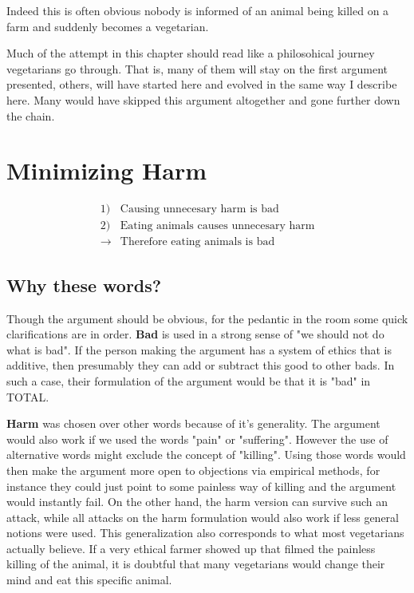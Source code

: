 \documentclass[12pt]{report}
\numberwithin{equation}{section}
\begin{document}
Indeed this is often obvious nobody is informed of an animal being killed on a farm and suddenly becomes a vegetarian.

Much of the attempt in this chapter should read like a philosohical journey vegetarians go through. That is, many of them will stay on the first argument presented, others, will have started here and evolved in the same way I describe here. Many would have skipped this argument altogether and gone further down the chain. 

\section{Minimizing Harm}


\begin{mdframed}[style=MyFrame]
\begin{align*}
1)& \text{Causing unnecesary harm is bad} \\
2)& \text{Eating animals causes unnecesary harm} \\
\rightarrow& \text{Therefore eating animals is bad}
\end{align*}
\end{mdframed}




\subsection{Why these words?}

Though the argument should be obvious, for the pedantic in the room some quick clarifications are in order. \textbf{Bad} is used in a strong sense of "we should not do what is bad". If the person making the argument has a system of ethics that is additive, then presumably they can add or subtract this good to other bads. In such a case, their formulation of the argument would be that it is "bad" in TOTAL.  

\textbf{Harm} was chosen over other words because of it's generality. The argument would also work if we used the words "pain" or "suffering". However the use of alternative words might exclude the concept of "killing". Using those words would then make the argument more open to objections via empirical methods, for instance they could just point to some painless way of killing and the argument would instantly fail. On the other hand, the harm version can survive such an attack, while all attacks on the harm formulation would also work if less general notions were used. This generalization also corresponds to what most vegetarians actually believe. If a very ethical farmer showed up that filmed the painless killing of the animal, it is doubtful that many vegetarians would change their mind and eat this specific animal. 
\end{document}
